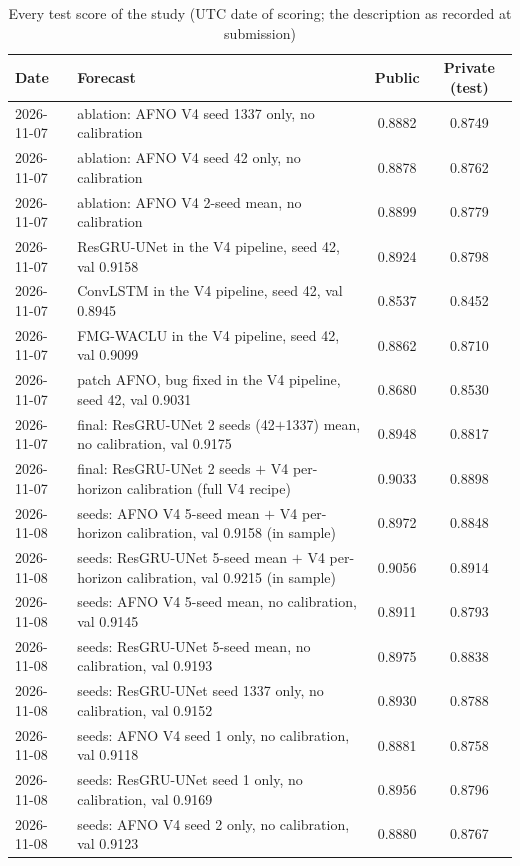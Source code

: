 \documentclass[journal]{IEEEtran}
\begin{document}
\begin{table}[tp]
\centering
\caption{Every test score of the study (UTC date of scoring; the description as recorded at submission)}
\label{tab:tests}
\begin{tabular}{@{}l>{\raggedright\arraybackslash}p{}cc@{}}
\toprule
Date & Forecast & Public & Private (test) \\
\midrule
2026-11-07 & ablation: AFNO V4 seed 1337 only, no calibration & 0.8882 & 0.8749 \\
2026-11-07 & ablation: AFNO V4 seed 42 only, no calibration & 0.8878 & 0.8762 \\
2026-11-07 & ablation: AFNO V4 2-seed mean, no calibration & 0.8899 & 0.8779 \\
2026-11-07 & ResGRU-UNet in the V4 pipeline, seed 42, val 0.9158 & 0.8924 & 0.8798 \\
2026-11-07 & ConvLSTM in the V4 pipeline, seed 42, val 0.8945 & 0.8537 & 0.8452 \\
2026-11-07 & FMG-WACLU in the V4 pipeline, seed 42, val 0.9099 & 0.8862 & 0.8710 \\
2026-11-07 & patch AFNO, bug fixed in the V4 pipeline, seed 42, val 0.9031 & 0.8680 & 0.8530 \\
2026-11-07 & final: ResGRU-UNet 2 seeds (42$+$1337) mean, no calibration, val 0.9175 & 0.8948 & 0.8817 \\
2026-11-07 & final: ResGRU-UNet 2 seeds $+$ V4 per-horizon calibration (full V4 recipe) & 0.9033 & 0.8898 \\
2026-11-08 & 5 seeds: AFNO V4 5-seed mean $+$ V4 per-horizon calibration, val 0.9158 (in sample) & 0.8972 & 0.8848 \\
2026-11-08 & 5 seeds: ResGRU-UNet 5-seed mean $+$ V4 per-horizon calibration, val 0.9215 (in sample) & 0.9056 & 0.8914 \\
2026-11-08 & 5 seeds: AFNO V4 5-seed mean, no calibration, val 0.9145 & 0.8911 & 0.8793 \\
2026-11-08 & 5 seeds: ResGRU-UNet 5-seed mean, no calibration, val 0.9193 & 0.8975 & 0.8838 \\
2026-11-08 & 5 seeds: ResGRU-UNet seed 1337 only, no calibration, val 0.9152 & 0.8930 & 0.8788 \\
2026-11-08 & 5 seeds: AFNO V4 seed 1 only, no calibration, val 0.9118 & 0.8881 & 0.8758 \\
2026-11-08 & 5 seeds: ResGRU-UNet seed 1 only, no calibration, val 0.9169 & 0.8956 & 0.8796 \\
2026-11-08 & 5 seeds: AFNO V4 seed 2 only, no calibration, val 0.9123 & 0.8880 & 0.8767 \\

\end{tabular}
\end{table}
\end{document}
